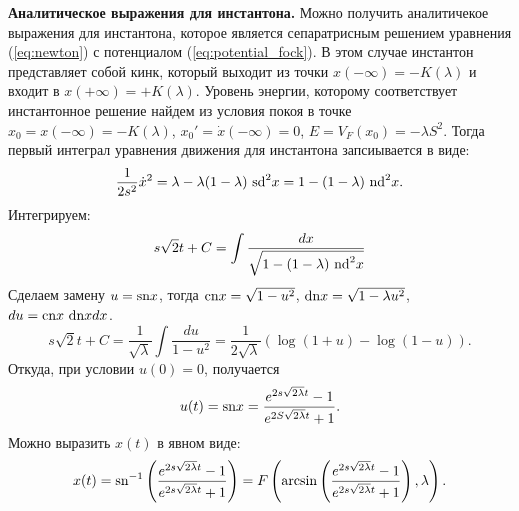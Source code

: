 \documentclass[12pt]{article}
\begin{document}
\textbf{Аналитическое выражения для инстантона.}
Можно получить аналитичекое выражения для инстантона, которое является сепаратрисным решением уравнения (\ref{eq:newton}) с потенциалом (\ref{eq:potential_fock}).
В этом случае инстантон представляет собой кинк, который выходит из точки $x(-\infty) = -K(\lambda)$ и входит в $x(+\infty) = +K(\lambda)$.
Уровень энергии, которому соответствует инстантонное решение найдем из условия покоя в точке $x_0 = x(-\infty) = -K(\lambda)$, $x_0' = \dot{x}(-\infty) = 0$, $E = V_F(x_0) = -\lambda S^2$.
Тогда первый интеграл уравнения движения для инстантона запсиывается в виде:
%
\begin{equation}
\frac{1}{2 s^2} \dot{x}^2 = \lambda - \lambda (1 - \lambda) ~\textrm{sd}^2 x = 1 - (1 - \lambda) ~\textrm{nd}^2 x.
\end{equation}
%
Интегрируем:
%
\begin{equation}
s \sqrt{2} t + C = \int\frac{dx}{\sqrt{1 - (1 - \lambda) ~\textrm{nd}^2 x}}
\end{equation}
%
Сделаем замену $u = \textrm{sn} x$, тогда $\textrm{cn} x = \sqrt{1 - u^2}$, $\textrm{dn} x = \sqrt{1 - \lambda u^2}$, $du = \textrm{cn} x ~\textrm{dn} x dx$.
%
\begin{equation}
s \sqrt{2} t + C = \frac{1}{\sqrt{\lambda}} \int \frac{du}{1 - u^2} = \frac{1}{2\sqrt{\lambda}} (\log(1 + u) - \log(1 - u)).
\end{equation}
%
Откуда, при условии $u(0) = 0$, получается
%
\begin{equation}
u(t) = \textrm{sn} x = \frac{e^{2 s \sqrt{2 \lambda} t} - 1}{e^{2S\sqrt{2 \lambda} t} + 1}.
\end{equation}
%
Можно выразить $x(t)$ в явном виде:
%
\begin{equation}
x(t) = \textrm{sn}^{-1} \left( \frac{e^{2s\sqrt{2 \lambda} t} - 1}{e^{2s\sqrt{2 \lambda} t} + 1} \right) = F \left(\arcsin \left( \frac{e^{2s\sqrt{2 \lambda} t} - 1}{e^{2s\sqrt{2 \lambda} t} + 1} \right) , \lambda \right).
\label{eq:instanton_fock}
\end{equation}
%
\end{document}

